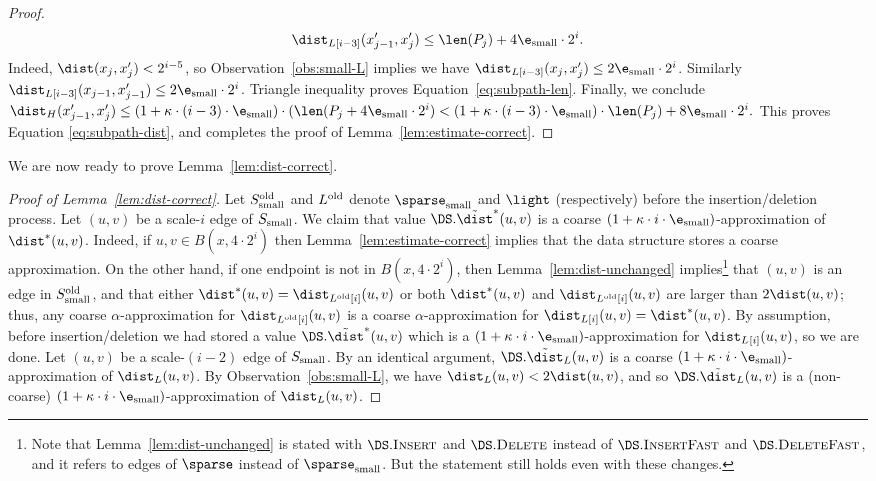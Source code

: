 \begin{proof}
\begin{equation}
\label{eq:subpath-len}
    \dist_{L[i-3]}(x_{j-1}', x_j') \le \len(P_j) + 4 \e_{\rm small} \cdot 2^i.
\end{equation}
Indeed,
$\dist(x_j, x_j') < 2^{i-5}$, so Observation~\ref{obs:small-L} implies we have $\dist_{L[i-3]}(x_{j},x_{j}') \le 2 \e_{\rm small}\cdot 2^i$. Similarly $\dist_{L[i-3]}(x_{j-1},x_{j-1}') \le 2 \e_{\rm small} \cdot 2^i$. Triangle inequality proves Equation~\ref{eq:subpath-len}.
Finally, we conclude
\(
  \dist_H(x'_{j-1},x'_j) \le (1+\kappa \cdot (i-3) \cdot \e_{\rm small})\cdot(\len(P_j + 4 \e_{\rm small} \cdot 2^i) 
  <(1+\kappa \cdot (i-3) \cdot \e_{\rm small})\cdot \len(P_j) + 8\e_{\rm small} \cdot 2^i.
  \)
This proves Equation \ref{eq:subpath-dist}, and completes the proof of Lemma~\ref{lem:estimate-correct}.
\end{proof}
We are now ready to prove Lemma~\ref{lem:dist-correct}.
\begin{proof}[Proof of Lemma~\ref{lem:dist-correct}]
Let $S_{\rm small}^{\rm old}$ and $L^{\rm old}$ denote $\sparse_{\rm small}$ and $\light$ (respectively) before the insertion/deletion process.
    Let $(u,v)$ be a scale-$i$ edge of $S_{\rm small}$. We claim that value $\DS.\tilde \dist^*(u,v)$ is a coarse $(1 + \kappa \cdot i \cdot \e_{\rm small})$-approximation of $\dist^*(u,v)$. Indeed, if $u,v \in B(x, 4 \cdot 2^i)$ then Lemma~\ref{lem:estimate-correct} implies that the data structure stores a coarse approximation. On the other hand, if one endpoint is not in $B(x, 4 \cdot 2^i)$, then Lemma~\ref{lem:dist-unchanged} implies\footnote{Note that Lemma~\ref{lem:dist-unchanged} is stated with  $\DS.\textsc{Insert}$ and $\DS.\textsc{Delete}$ instead of $\DS.\textsc{InsertFast}$ and $\DS.\textsc{DeleteFast}$, and it refers to edges of $\sparse$ instead of $\sparse_{\rm small}$. But the statement still holds even with these changes.} that $(u,v)$ is an edge in $S^{\rm old}_{\rm small}$, and that either $\dist^*(u,v) = \dist_{L^{\rm old}[i]}(u,v)$ or both $\dist^*(u,v)$ and $\dist_{L^{\rm old}[i]}(u,v)$ are larger than $2 \dist(u,v)$; thus, any coarse $\alpha$-approximation for $\dist_{L^{\rm old}[i]}(u,v)$ is a coarse $\alpha$-approximation for $\dist_{L[i]}(u,v) = \dist^*(u,v)$. By assumption, before insertion/deletion we had stored a value $\DS.\tilde \dist^*(u,v)$ which is a $(1 + \kappa \cdot i \cdot \e_{\rm small})$-approximation for $\dist_{L^{\rm}[i]}(u,v)$, so we are done.
%
    Let $(u,v)$ be a scale-$(i-2)$ edge of $S_{\rm small}$. By an identical argument, $\DS.\tilde \dist_L(u,v)$ is a coarse $(1 + \kappa \cdot i \cdot \e_{\rm small})$-approximation of $\dist_L(u,v)$. By Observation~\ref{obs:small-L}, we have $\dist_L(u,v) < 2 \dist(u,v)$, and so $\DS.\tilde \dist_L(u,v)$ is a (non-coarse) $(1 + \kappa \cdot i \cdot \e_{\rm small})$-approximation of $\dist_L(u,v)$.
\end{proof}
